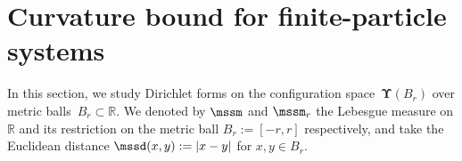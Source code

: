 \documentclass[11pt,letterpaper]{amsart}
\newcommand{\diff}{\mathop{}\!\mathrm{d}}
\newcommand{\paren}[1]{\left(#1\right)}							%
\newcommand{\seq}[1]{\paren{#1}}								%
\newcommand{\N}{{\mathbb N}}
\newcommand{\R}{{\mathbb R}}
\newcommand{\comma}{\,\,\mathrm{,}\;\,}
\newcommand{\fstop}{\,\,\mathrm{.}}
\newcommand{\dUpsilon}{{\mathbf \Upsilon}}
\newcommand{\U}{\dUpsilon}
\newcommand{\sine}{\mathsf{sine}}
\renewcommand{\1}{\mathbf 1}
\numberwithin{equation}{section}
\theoremstyle{plain}
\theoremstyle{definition}
\theoremstyle{remark}
\renewcommand{\paragraph}[1]{\medskip\emph{#1}.\quad}
\begin{document}

\section{Curvature bound for finite-particle systems} \label{sec: Pre}
In this section, we study Dirichlet forms on the configuration space~$\U(B_r)$ over metric balls~$B_r \subset \R$. We denoted by $\mssm$ and $\mssm_r$ the Lebesgue measure on $\R$ and its restriction on the metric ball $B_r:=[-r, r]$ respectively, and take the Euclidean distance $\mssd(x, y):=|x-y|$ for $x, y \in B_r$. 
\end{document}
